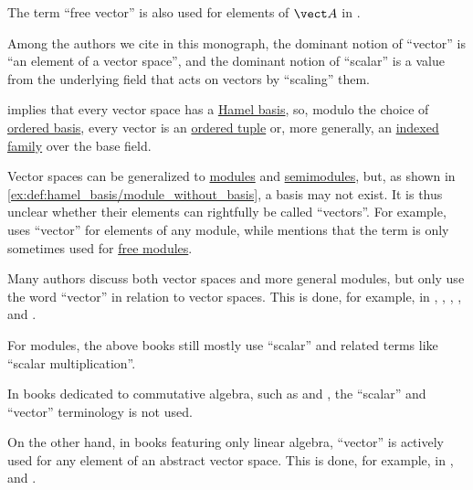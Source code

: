 \begin{remark}
\begin{thmenum}
    The term \enquote{free vector} is also used for elements of \( \vect A \) in \cite[def. II.9.1]{Bourbaki1998Algebra1to3}.

     Among the authors we cite in this monograph, the dominant notion of \enquote{vector} is \enquote{an element of a vector space}, and the dominant notion of \enquote{scalar} is a value from the underlying field that acts on vectors by \enquote{scaling} them.

     implies that every vector space has a \hyperref[def:hamel_basis]{Hamel basis}, so, modulo the choice of \hyperref[def:ordered_hamel_basis]{ordered basis}, every vector is an \hyperref[def:ordered_tuple]{ordered tuple} or, more generally, an \hyperref[def:indexed_family]{indexed family} over the base field.

    Vector spaces can be generalized to \hyperref[def:module]{modules} and \hyperref[def:semimodule]{semimodules}, but, as shown in \cref{ex:def:hamel_basis/module_without_basis}, a basis may not exist. It is thus unclear whether their elements can rightfully be called \enquote{vectors}. For example, \textcite[78]{Мальцев2009ОсновыЛинейнойАлгебры} uses \enquote{vector} for elements of any module, while \textcite[308]{Aluffi2009Algebra} mentions that the term is only sometimes used for \hyperref[def:free_semimodule]{free modules}.

    Many authors discuss both vector spaces and more general modules, but only use the word \enquote{vector} in relation to vector spaces. This is done, for example, in
    \cite[34]{Knapp2016BasicAlgebra},
    \cite[118]{Lang2002Algebra},
    \cite[308]{Aluffi2009Algebra},
    \cite[247]{Rotman2015AdvancedModernAlgebraPart1},
    \cite[def. II.1.2]{Bourbaki1998Algebra1to3} and
    \cite[13]{Кострикин2020АлгебраЧасть2}.

    For modules, the above books still mostly use \enquote{scalar} and related terms like \enquote{scalar multiplication}.

    In books dedicated to commutative algebra, such as \cite{Eisenbud1995CommutativeAlgebra} and \cite{КоцевСидеров2016КомутативнаАлгебра}, the \enquote{scalar} and \enquote{vector} terminology is not used.

    On the other hand, in books featuring only linear algebra, \enquote{vector} is actively used for any element of an abstract vector space. This is done, for example, in
    \cite[7]{FriedbergInselSpence2018LinearAlgebra},
    \cite[185]{Курош1968КурсВысшейАлгебры} and
    \cite[111]{Обрешков1962ВисшаАлгебра}.


\end{thmenum}
\end{remark}
